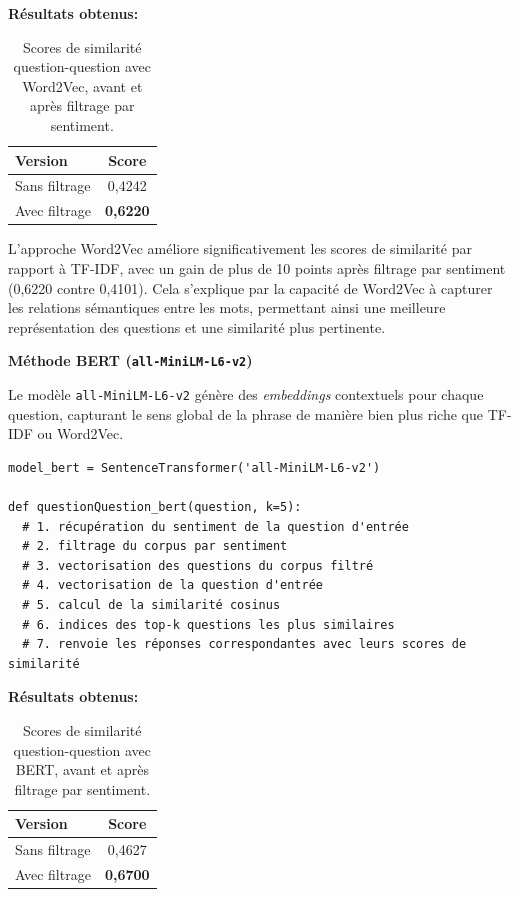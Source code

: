 \documentclass[12pt,a4paper]{report}
\begin{document}
\begin{center}
\textbf{Résultats obtenus:}
\end{center}
\begin{table}[H]
\begin{center}
\begin{tabular}{@{}lc@{}}
  \toprule
  Version & Score \\
  \midrule
  Sans filtrage & 0,4242 \\
  Avec filtrage  & \textbf{0,6220} \\
  \bottomrule
\end{tabular}
\end{center}
\caption{Scores de similarité question-question avec Word2Vec, avant et après filtrage par sentiment.}
\end{table}

\begin{note}
L'approche Word2Vec améliore significativement les scores de similarité par rapport à TF-IDF, avec un gain de plus de 10 points après filtrage par sentiment (0,6220 contre 0,4101). 
Cela s'explique par la capacité de Word2Vec à capturer les relations sémantiques entre les mots, permettant ainsi une meilleure représentation des questions et une similarité plus pertinente.
\end{note}

\pagebreak

\textbf{Méthode BERT (\texttt{all-MiniLM-L6-v2})}

Le modèle \texttt{all-MiniLM-L6-v2} génère des \textit{embeddings} contextuels pour chaque question, capturant le sens global de la phrase de manière bien plus riche que TF-IDF ou Word2Vec.

\begin{lstlisting}
model_bert = SentenceTransformer('all-MiniLM-L6-v2')

def questionQuestion_bert(question, k=5):
  # 1. récupération du sentiment de la question d'entrée
  # 2. filtrage du corpus par sentiment
  # 3. vectorisation des questions du corpus filtré
  # 4. vectorisation de la question d'entrée
  # 5. calcul de la similarité cosinus
  # 6. indices des top-k questions les plus similaires
  # 7. renvoie les réponses correspondantes avec leurs scores de similarité
\end{lstlisting}

\begin{center}
\textbf{Résultats obtenus:}
\end{center}
\begin{table}[H]
\begin{center}
\begin{tabular}{@{}lc@{}}
  \toprule
  Version & Score \\
  \midrule
  Sans filtrage & 0,4627 \\
  Avec filtrage  & \textbf{0,6700} \\
  \bottomrule
\end{tabular}
\end{center}
\caption{Scores de similarité question-question avec BERT, avant et après filtrage par sentiment.}
\end{table}
\end{document}
